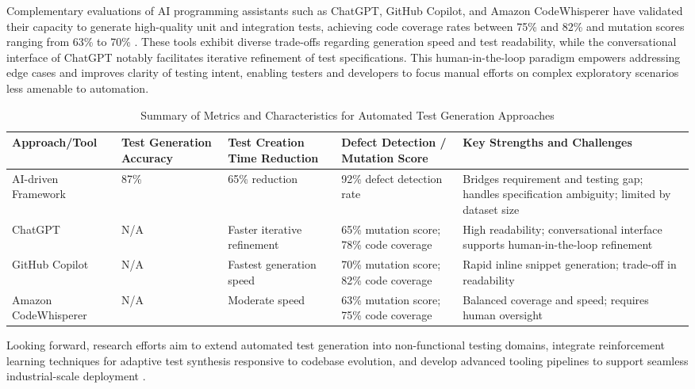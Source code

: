 \documentclass[sigconf]{acmart}
\begin{document}
Complementary evaluations of AI programming assistants such as ChatGPT, GitHub Copilot, and Amazon CodeWhisperer have validated their capacity to generate high-quality unit and integration tests, achieving code coverage rates between 75\% and 82\% and mutation scores ranging from 63\% to 70\% \cite{ref32}. These tools exhibit diverse trade-offs regarding generation speed and test readability, while the conversational interface of ChatGPT notably facilitates iterative refinement of test specifications. This human-in-the-loop paradigm empowers addressing edge cases and improves clarity of testing intent, enabling testers and developers to focus manual efforts on complex exploratory scenarios less amenable to automation.

\begin{table*}[htbp]
\centering
\caption{Summary of Metrics and Characteristics for Automated Test Generation Approaches}
\label{tab:test_generation_summary}
\begin{adjustbox}{max width=\textwidth}
\begin{tabular}{@{}lllll@{}}
\toprule
Approach/Tool & Test Generation Accuracy & Test Creation Time Reduction & Defect Detection / Mutation Score & Key Strengths and Challenges \\ \midrule
AI-driven Framework \cite{ref30} & 87\% & 65\% reduction & 92\% defect detection rate & Bridges requirement and testing gap; handles specification ambiguity; limited by dataset size \\ 
ChatGPT \cite{ref32} & N/A & Faster iterative refinement & 65\% mutation score; 78\% code coverage & High readability; conversational interface supports human-in-the-loop refinement \\ 
GitHub Copilot \cite{ref32} & N/A & Fastest generation speed & 70\% mutation score; 82\% code coverage & Rapid inline snippet generation; trade-off in readability \\ 
Amazon CodeWhisperer \cite{ref32} & N/A & Moderate speed & 63\% mutation score; 75\% code coverage & Balanced coverage and speed; requires human oversight \\ \bottomrule
\end{tabular}
\end{adjustbox}
\end{table*}

Looking forward, research efforts aim to extend automated test generation into non-functional testing domains, integrate reinforcement learning techniques for adaptive test synthesis responsive to codebase evolution, and develop advanced tooling pipelines to support seamless industrial-scale deployment \cite{ref30}.
\end{document}
